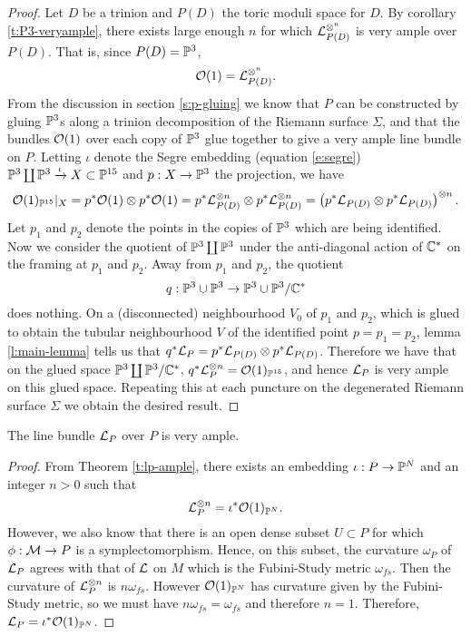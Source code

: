 	\begin{proof}
		Let $D$ be a trinion and $P(D)$ the toric moduli space for $D$. By corollary \ref{t:P3-veryample}, there exists large enough $n$ for which $\mathcal{L}_{P(D)}^{\otimes^n}$ is very ample over $P(D)$. That is, since $P(D) = \mathbb{P}^3$,
		\begin{equation}
			\mathcal{O}(1) = \mathcal{L}_{P(D)}^{\otimes^n}.
		\end{equation}
		From the discussion in section \ref{s:p-gluing} we know that $P$ can be constructed by gluing $\mathbb{P}^3$s along a trinion decomposition of the Riemann surface $\Sigma$, and that the bundles $\mathcal{O}(1)$ over each copy of $\mathbb{P}^3$ glue together to give a very ample line bundle on $P$. Letting $\iota$ denote the Segre embedding (equation \ref{e:segre}) $\mathbb{P}^3 \coprod \mathbb{P}^3 \xrightarrow{\iota} X\subset \mathbb{P}^{15}$ and $p:X\to \mathbb{P}^3$ the projection, we have
		\begin{equation}
			\mathcal{O}(1)_{\mathbb{P}^{15}}|_X = p^\ast \mathcal{O}(1)\otimes p^\ast \mathcal{O}(1) = p^\ast \mathcal{L}_{P(D)}^{\otimes n}\otimes p^\ast \mathcal{L}_{P(D)}^{\otimes n} = \left(p^\ast \mathcal{L}_{P(D)}\otimes p^\ast \mathcal{L}_{P(D)}\right)^{\otimes n}.
		\end{equation}
		Let $p_1$ and $p_2$ denote the points in the copies of $\mathbb{P}^3$ which are being identified. Now we consider the quotient of $\mathbb{P}^3 \coprod \mathbb{P}^3$ under the anti-diagonal action of $\mathbb{C}^\ast$ on the framing at $p_1$ and $p_2$. Away from $p_1$ and $p_2$, the quotient
		\begin{equation}
			q: \mathbb{P}^3 \cup \mathbb{P}^3 \to \mathbb{P}^3 \cup \mathbb{P}^3 / \mathbb{C}^\ast
		\end{equation}
		does nothing. On a (disconnected) neighbourhood $V_0$ of $p_1$ and $p_2$, which is glued to obtain the tubular neighbourhood $V$ of the identified point $p=p_1=p_2$, lemma \ref{l:main-lemma} tells us that $q^\ast \mathcal{L}_{P} = p^\ast \mathcal{L}_{P(D)}\otimes p^\ast \mathcal{L}_{P(D)}$. Therefore we have that on the glued space $\mathbb{P}^3\coprod \mathbb{P}^3 / \mathbb{C}^\ast$, $q^\ast \mathcal{L}_P^{\otimes n} = \mathcal{O}(1)_{\mathbb{P}^{15}}$, and hence $\mathcal{L}_P$ is very ample on this glued space. Repeating this at each puncture on the degenerated Riemann surface $\Sigma$ we obtain the desired result.
	\end{proof}
	\begin{corollary}
		The line bundle $\mathcal{L}_P$ over $P$ is very ample.
	\end{corollary}
	\begin{proof}
		From Theorem \ref{t:lp-ample}, there exists an embedding $\iota:P\to\mathbb{P}^N$ and an integer $n>0$ such that
		\begin{equation}
		\mathcal{L}^{\otimes n}_P = \iota^\ast \mathcal{O}(1)_{\mathbb{P}^N}.
		\end{equation}
		However, we also know that there is an open dense subset $U \subset P$ for which $\phi:\mathcal{M}\to P$ is a symplectomorphism. Hence, on this subset, the curvature $\omega_P$ of $\mathcal{L}_P$ agrees with that of $\mathcal{L}$ on $M$ which is the Fubini-Study metric $\omega_{fs}$. Then the curvature of $\mathcal{L}^{\otimes n}_P$ is $n\omega_{fs}$. However $\mathcal{O}(1)_{\mathbb{P}^N}$ has curvature given by the Fubini-Study metric, so we must have $n\omega_{fs} = \omega_{fs}$ and therefore $n=1$. Therefore, $\mathcal{L}_P = \iota^\ast \mathcal{O}(1)_{\mathbb{P}^N}$.
	\end{proof}
